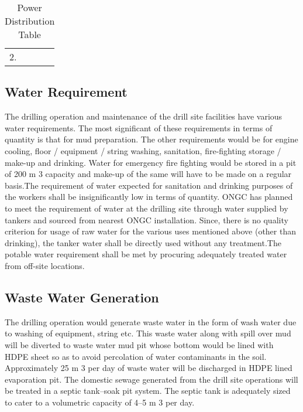 \begin{table}
\begin{tabular}{|l|l|l|l|}
\multirow{2}{*}{2.} & \multirow{2}{*}{}                                                                                          &             &     \\ \cline{3-4} 
                    &                                                                                                            &             &     \\ \hline
\end{tabular}

\caption{Power Distribution Table}
\end{table}


\subsection{\textbf{Water Requirement}}

The drilling operation and maintenance of the drill site facilities have various water requirements. The most significant of these requirements in terms of quantity is that for mud preparation. The other requirements would be for engine cooling, floor / equipment / string washing, sanitation, fire-fighting storage / make-up and
drinking. Water for emergency fire fighting would be stored in a pit of 200 m 3 capacity and make-up of the same will have to be made on a regular basis.The requirement of water expected for sanitation and drinking purposes of the workers shall be insignificantly low in terms of quantity. ONGC has planned to meet the requirement of water at the drilling site through water supplied by tankers and sourced from nearest ONGC installation. Since, there is no quality criterion for usage of raw water for the various uses mentioned above (other than drinking), the tanker water shall be directly used without any treatment.The potable water requirement shall be met by procuring adequately treated water from off-site locations.

\subsection{\textbf{Waste Water Generation}}

The drilling operation would generate waste water in the form of wash water due to washing of equipment, string etc. This waste water along with spill over mud will be diverted to waste water mud pit whose bottom would be lined with HDPE sheet so as to avoid percolation of water contaminants in the soil. Approximately 25 m 3 per day of waste water will be discharged in HDPE lined evaporation pit. The domestic sewage generated from the drill site operations will be treated in a septic tank–soak pit system. The septic tank is adequately sized to cater to a volumetric capacity of 4–5 m 3 per day.

